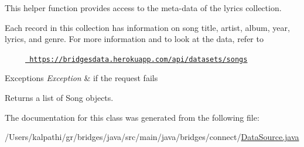 This helper function provides access to the meta-\/data of the lyrics collection.

Each record in this collection has information on song title, artist, album, year, lyrics, and genre. For more information and to look at the data, refer to 

~~~~~\href{https://bridgesdata.herokuapp.com/api/datasets/songs}{\texttt{ https\+://bridgesdata.\+herokuapp.\+com/api/datasets/songs}} 


\begin{DoxyExceptions}{Exceptions}
{\em Exception} & if the request fails\\
\hline
\end{DoxyExceptions}
\begin{DoxyReturn}{Returns}
a list of Song objects. 
\end{DoxyReturn}


The documentation for this class was generated from the following file\+:\begin{DoxyCompactItemize}
\item 
/\+Users/kalpathi/gr/bridges/java/src/main/java/bridges/connect/\mbox{\hyperlink{connect_2_data_source_8java}{Data\+Source.\+java}}\end{DoxyCompactItemize}

